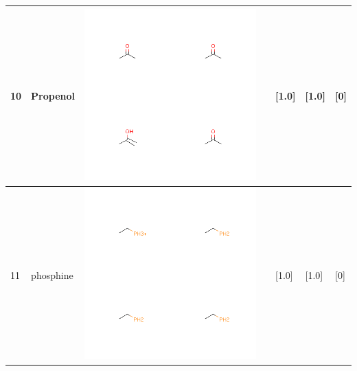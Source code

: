 \begin{longtable}{|l|l|l|l|l|l|l|}
\hline
10 & Propenol & \includegraphics[scale=0.6]{PropenolCA.png} & & [1.0]& [1.0] & [0] \\
\hline
11 & phosphine & \includegraphics[scale=0.6]{phosphineCA.png} & & [1.0]& [1.0] & [0] \\
\hline

\end{longtable}
